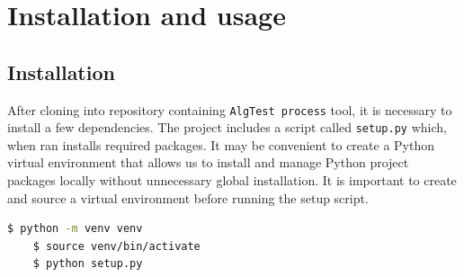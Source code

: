 \section{Installation and usage}
\subsection{Installation}
After cloning into repository containing \texttt{AlgTest process} tool, it is necessary to install a few dependencies. The project includes a script called \texttt{setup.py} which, when ran installs required packages. It may be convenient to create a Python virtual environment that allows us to install and manage Python project packages locally without unnecessary global installation. It is important to create and source a virtual environment before running the setup script.
\begin{lstlisting}[language=bash]
    $ python -m venv venv
    $ source venv/bin/activate
    $ python setup.py
\end{lstlisting}

